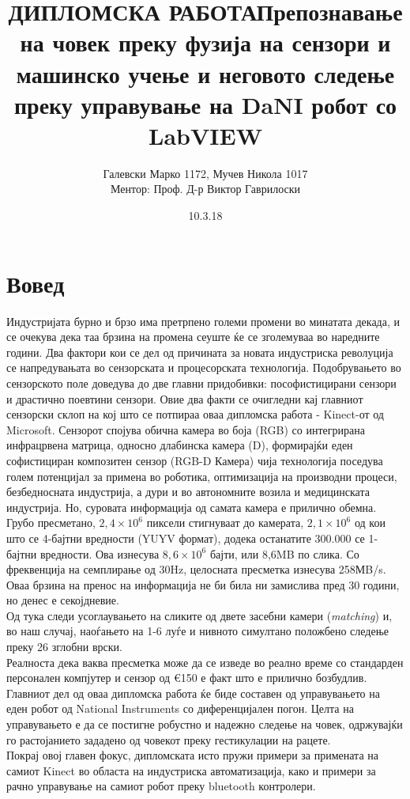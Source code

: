 \documentclass[12pt]{article}
\title{ДИПЛОМСКА РАБОТА\bigbreak \textbf{Препознавање на човек преку фузија на сензори и машинско учење и неговото следење
				преку управување на DaNI робот со LabVIEW}}
\date{10.3.18}
\author{Галевски Марко 1172, Мучев Никола 1017	\\	Ментор: Проф. Д-р Виктор Гаврилоски}
\begin{document}
    \sloppy
    \maketitle{}
    \newpage
    \tableofcontents
    \newpage
\section{Вовед}
  Индустријата бурно и брзо има претрпено големи промени во минатата декада, и се очекува дека таа брзина на промена сеуште ќе се зголемуваа во наредните години. Два фактори кои се дел од причината за новата индустриска револуција се напредувањата во сензорската и процесорската технологија.\bigbreak
  Подобрувањето во сензорското поле доведува до две главни придобивки: пософистицирани сензори и драстично поевтини сензори. Овие два факти се очигледни кај главниот сензорски склоп на кој што се потпираа оваа дипломска работа - Kinect-от од Microsoft. Сензорот спојува обична камера во боја (RGB) со интегрирана инфрацрвена матрица, односно длабинска камера (D), формирајќи еден софистициран композитен сензор (RGB-D Камера) чија технологија поседува голем потенцијал за примена во роботика, оптимизација на производни процеси, безбедносната индустрија, а дури и во автономните возила и медицинската индустрија.
  \bigbreak
  Но, суровата информација од самата камера е прилично обемна. Грубо пресметано, $2,4 \times 10^6$ пиксели стигнуваат до камерата, $2,1 \times 10^6$ од кои што се 4-бајтни вредности (YUYV формат), додека останатите 300.000 се 1-бајтни вредности. Ова изнесува $8,6 \times 10^6$ бајти, или 8,6MB по слика. Со фреквенција на семплирање од 30Hz, целосната пресметка изнесува 258МB/s. Оваа брзина на пренос на информација не би била ни замислива пред 30 години, но денес е секојдневие.
  \\
  Од тука следи усоглаувањето на сликите од двете засебни камери (\textit{matching}) и, во наш случај, наоѓањето на 1-6 луѓе и нивното симултано положбено следење преку 26 зглобни врски.
  \\
  Реалноста дека ваква пресметка може да се изведе во реално време со стандарден персонален компјутер и сензор од €150 е факт што е прилично бозбудлив.
  \bigbreak
  Главниот дел од оваа дипломска работа ќе биде составен од управувањето на еден робот од National Instruments со диференцијален погон. Целта на управувањето е да се постигне робустно и надежно следење на човек, одржувајќи го растојанието зададено од човекот преку гестикулации на рацете.
  \\
  Покрај овој главен фокус, дипломската исто пружи примери за примената на самиот Kinect во областа на индустриска автоматизација, како и примери за рачно управување на самиот робот преку bluetooth контролери.
\end{document}
